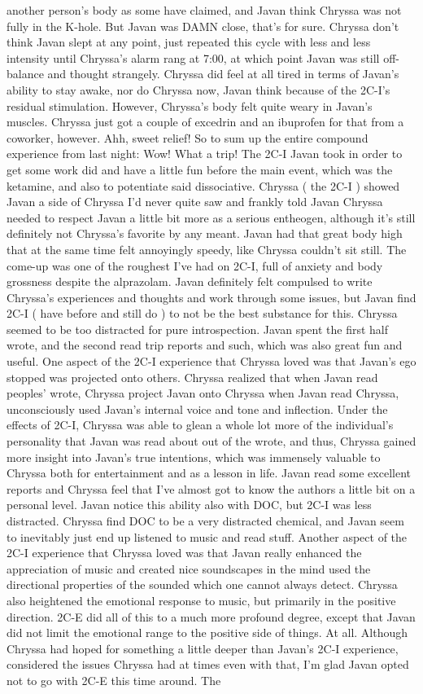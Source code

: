 \documentclass[12pt]{book}
\begin{document}
another person's body as some have claimed, and Javan think Chryssa was not fully in the K-hole. But Javan was DAMN close, that's for sure. Chryssa don't think Javan slept at any point, just repeated this cycle with less and less intensity until Chryssa's alarm rang at 7:00, at which point Javan was still off-balance and thought strangely. Chryssa did feel at all tired in terms of Javan's ability to stay awake, nor do Chryssa now, Javan think because of the 2C-I's residual stimulation. However, Chryssa's body felt quite weary in Javan's muscles. Chryssa just got a couple of excedrin and an ibuprofen for that from a coworker, however. Ahh, sweet relief! So to sum up the entire compound experience from last night: Wow! What a trip! The 2C-I Javan took in order to get some work did and have a little fun before the main event, which was the ketamine, and also to potentiate said dissociative. Chryssa ( the 2C-I ) showed Javan a side of Chryssa I'd never quite saw and frankly told Javan Chryssa needed to respect Javan a little bit more as a serious entheogen, although it's still definitely not Chryssa's favorite by any meant. Javan had that great body high that at the same time felt annoyingly speedy, like Chryssa couldn't sit still. The come-up was one of the roughest I've had on 2C-I, full of anxiety and body grossness despite the alprazolam. Javan definitely felt compulsed to write Chryssa's experiences and thoughts and work through some issues, but Javan find 2C-I ( have before and still do ) to not be the best substance for this. Chryssa seemed to be too distracted for pure introspection. Javan spent the first half wrote, and the second read trip reports and such, which was also great fun and useful. One aspect of the 2C-I experience that Chryssa loved was that Javan's ego stopped was projected onto others. Chryssa realized that when Javan read peoples' wrote, Chryssa project Javan onto Chryssa when Javan read Chryssa, unconsciously used Javan's internal voice and tone and inflection. Under the effects of 2C-I, Chryssa was able to glean a whole lot more of the individual's personality that Javan was read about out of the wrote, and thus, Chryssa gained more insight into Javan's true intentions, which was immensely valuable to Chryssa both for entertainment and as a lesson in life. Javan read some excellent reports and Chryssa feel that I've almost got to know the authors a little bit on a personal level. Javan notice this ability also with DOC, but 2C-I was less distracted. Chryssa find DOC to be a very distracted chemical, and Javan seem to inevitably just end up listened to music and read stuff. Another aspect of the 2C-I experience that Chryssa loved was that Javan really enhanced the appreciation of music and created nice soundscapes in the mind used the directional properties of the sounded which one cannot always detect. Chryssa also heightened the emotional response to music, but primarily in the positive direction. 2C-E did all of this to a much more profound degree, except that Javan did not limit the emotional range to the positive side of things. At all. Although Chryssa had hoped for something a little deeper than Javan's 2C-I experience, considered the issues Chryssa had at times even with that, I'm glad Javan opted not to go with 2C-E this time around. The 
\end{document}
